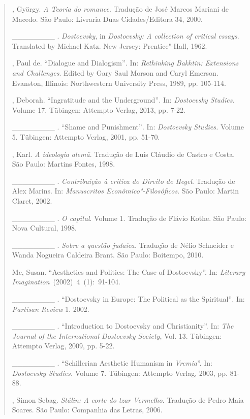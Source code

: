 {\begin{quote}
\begin{Parskip}
\emph{,} György. \emph{A Teoria do romance}. Tradução de José
Marcos Mariani de Macedo. São Paulo: Livraria Duas Cidades/Editora 34,
2000.

\_\_\_\_\_\_\_\_ . \emph{Dostoevsky}, in \emph{Dostoevsky: A collection
of critical essays}. Translated by Michael Katz. New Jersey:
Prentice"-Hall, 1962.

, Paul de. ``Dialogue and Dialogism''\emph{.} In: \emph{Rethinking
Bakhtin: Extensions and Challenges}. Edited by Gary Saul Morson and
Caryl Emerson. Evanston, Illinois: Northwestern University Press, 1989,
pp. 105-114.

, Deborah. ``Ingratitude and the Underground''\emph{.} In:
\emph{Dostoevsky Studies.} Volume 17. Tübingen: Attempto Verlag, 2013,
pp. 7-22.

\_\_\_\_\_\_\_\_ . ``Shame and Punishment''\emph{.} In: \emph{Dostoevsky
Studies.} Volume 5. Tübingen: Attempto Verlag, 2001, pp. 51-70.

, Karl. \emph{A ideologia alemã}. Tradução de Luís Cláudio de Castro
e Costa. São Paulo: Martins Fontes, 1998.

\_\_\_\_\_\_\_\_ . \emph{Contribuição à crítica do Direito de Hegel}.
Tradução de Alex Marins. In: \emph{Manuscritos Econômico"-Filosóficos}.
São Paulo: Martin Claret, 2002.

\_\_\_\_\_\_\_\_ . \emph{O capital}. Volume 1. Tradução de Flávio Kothe.
São Paulo: Nova Cultural, 1998.

\_\_\_\_\_\_\_\_ . \emph{Sobre a questão judaica.} Tradução de Nélio
Schneider e Wanda Nogueira Caldeira Brant. São Paulo: Boitempo, 2010.

Mc, Susan. ``Aesthetics and Politics: The Case of Dostoevsky''.
In: \emph{Literary Imagination}~(2002)~4~(1):~91-104.

\_\_\_\_\_\_\_\_ . ``Dostoevsky in Europe: The Political as the
Spiritual''\emph{.} In: \emph{Partisan Review} 1. 2002.

\_\_\_\_\_\_\_\_ . ``Introduction to Dostoevsky and Christianity''. In:
\emph{The Journal of the International Dostoevsky Society}, Vol. 13.
Tübingen: Attempto Verlag, 2009, pp. 5-22.

\_\_\_\_\_\_\_\_ . ``Schillerian Aesthetic Humanism in \emph{Vremia}''.
In: \emph{Dostoevsky Studies.} Volume 7. Tübingen: Attempto Verlag,
2003, pp. 81-88.

, Simon Sebag. \emph{Stálin: A corte do tzar Vermelho}.
Tradução de Pedro Maia Soares. São Paulo: Companhia das Letras, 2006.


\end{Parskip}
\end{quote}}
